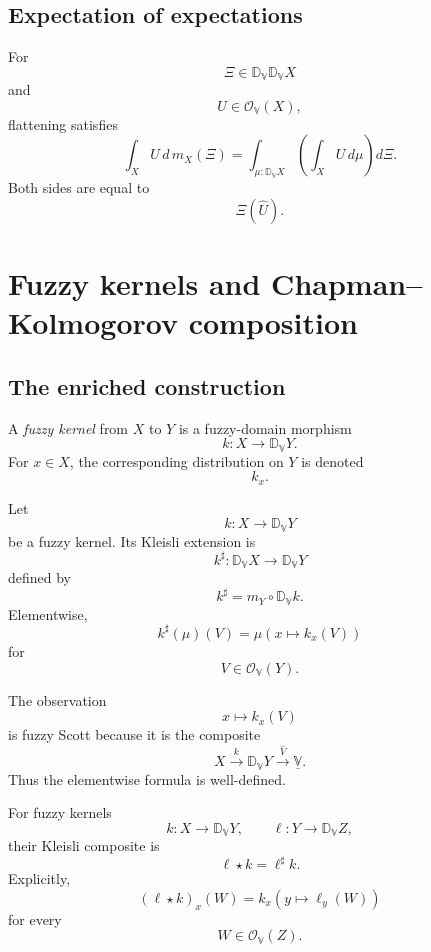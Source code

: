\subsection{Expectation of expectations}
\label{subsec:expectation-of-expectations}

For
\[
    \Xi\in\mathbb D_{\mathbb V}\mathbb D_{\mathbb V}X
\]
and
\[
    U\in\mathcal O_{\mathbb V}(X),
\]
flattening satisfies
\[
    \int_X U\,d\,m_X(\Xi)
    =
    \int_{\mu:\mathbb D_{\mathbb V}X}
    \left(
        \int_X U\,d\mu
    \right)
    d\Xi.
\]
Both sides are equal to
\[
    \Xi(\widehat U).
\]

\section{Fuzzy kernels and Chapman--Kolmogorov composition}
\label{sec:fuzzy-kernels-chapman-kolmogorov}

\subsection{The enriched construction}
\label{subsec:kernels-enriched}

\begin{definition}
\label{def:fuzzy-kernel}
A \emph{fuzzy kernel} from \(X\) to \(Y\) is a fuzzy-domain morphism
\[
    k:X\to\mathbb D_{\mathbb V}Y.
\]
For \(x\in X\), the corresponding distribution on \(Y\) is denoted
\[
    k_x.
\]
\end{definition}

\begin{definition}
\label{def:fuzzy-kleisli-extension}
Let
\[
    k:X\to\mathbb D_{\mathbb V}Y
\]
be a fuzzy kernel.  Its Kleisli extension is
\[
    k^{\sharp}:
    \mathbb D_{\mathbb V}X\to\mathbb D_{\mathbb V}Y
\]
defined by
\[
    k^{\sharp}
    =
    m_Y\circ\mathbb D_{\mathbb V}k.
\]
Elementwise,
\[
    k^{\sharp}(\mu)(V)
    =
    \mu(x\mapsto k_x(V))
\]
for
\[
    V\in\mathcal O_{\mathbb V}(Y).
\]
\end{definition}

The observation
\[
    x\longmapsto k_x(V)
\]
is fuzzy Scott because it is the composite
\[
    X
    \xrightarrow{k}
    \mathbb D_{\mathbb V}Y
    \xrightarrow{\widehat V}
    \underline{\mathbb V}.
\]
Thus the elementwise formula is well-defined.

\begin{definition}
\label{def:fuzzy-kleisli-composite}
For fuzzy kernels
\[
    k:X\to\mathbb D_{\mathbb V}Y,
    \qquad
    \ell:Y\to\mathbb D_{\mathbb V}Z,
\]
their Kleisli composite is
\[
    \ell\star k
    =
    \ell^{\sharp}k.
\]
Explicitly,
\[
    (\ell\star k)_x(W)
    =
    k_x(y\mapsto \ell_y(W))
\]
for every
\[
    W\in\mathcal O_{\mathbb V}(Z).
\]
\end{definition}

